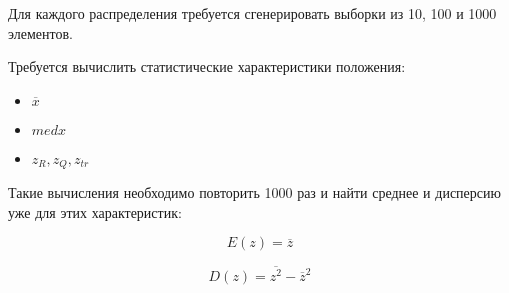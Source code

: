 \item Для каждого распределения требуется сгенерировать выборки из 10, 100 и 1000 элементов. 

Требуется вычислить статистические характеристики положения:
\begin{itemize}
	\item $\overline{x}$
	\item $med x$
	\item $z_R, z_Q, z_{tr}$
\end{itemize}

Такие вычисления необходимо повторить 1000 раз и найти среднее и дисперсию уже для этих характеристик:

\begin{equation}\label{ez}
	E(z)=\overline{z}
\end{equation}

\begin{equation}\label{dz}
	D(z)=\overline{z^2}-\overline{z}^2
\end{equation}
